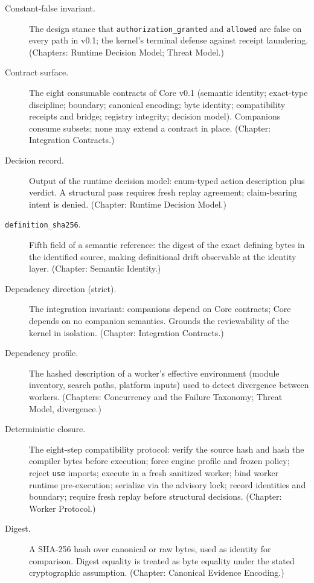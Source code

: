 \begin{description}
\item[Constant-false invariant.] The design stance that \texttt{authorization\_granted} and \texttt{allowed} are false on every path in v0.1; the kernel's terminal defense against receipt laundering. (Chapters: Runtime Decision Model; Threat Model.)

\item[Contract surface.] The eight consumable contracts of Core v0.1 (semantic identity; exact-type discipline; boundary; canonical encoding; byte identity; compatibility receipts and bridge; registry integrity; decision model). Companions consume subsets; none may extend a contract in place. (Chapter: Integration Contracts.)

\item[Decision record.] Output of the runtime decision model: enum-typed action description plus verdict. A structural pass requires fresh replay agreement; claim-bearing intent is denied. (Chapter: Runtime Decision Model.)

\item[\texttt{definition\_sha256}.] Fifth field of a semantic reference: the digest of the exact defining bytes in the identified source, making definitional drift observable at the identity layer. (Chapter: Semantic Identity.)

\item[Dependency direction (strict).] The integration invariant: companions depend on Core contracts; Core depends on no companion semantics. Grounds the reviewability of the kernel in isolation. (Chapter: Integration Contracts.)

\item[Dependency profile.] The hashed description of a worker's effective environment (module inventory, search paths, platform inputs) used to detect divergence between workers. (Chapters: Concurrency and the Failure Taxonomy; Threat Model, divergence.)

\item[Deterministic closure.] The eight-step compatibility protocol: verify the source hash and hash the compiler bytes before execution; force engine profile and frozen policy; reject \texttt{use} imports; execute in a fresh sanitized worker; bind worker runtime pre-execution; serialize via the advisory lock; record identities and boundary; require fresh replay before structural decisions. (Chapter: Worker Protocol.)

\item[Digest.] A SHA-256 hash over canonical or raw bytes, used as identity for comparison. Digest equality is treated as byte equality under the stated cryptographic assumption. (Chapter: Canonical Evidence Encoding.)


\end{description}
